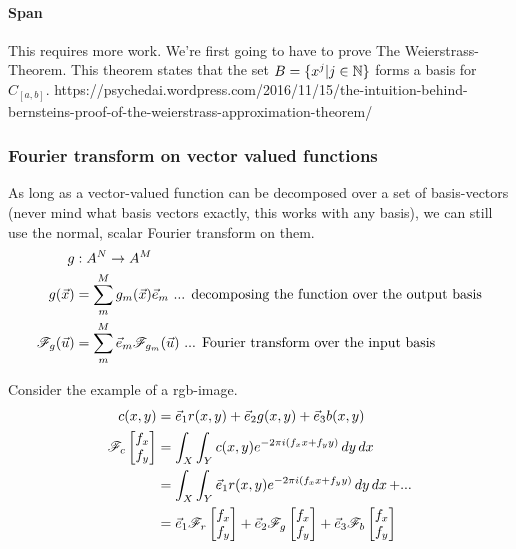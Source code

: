 \paragraph{Span} This  requires more work.  We're first going to have to prove The Weierstrass-Theorem. This theorem states that the set $B = \{ x^j | j \in \mathbb{N} \}$ forms a basis for $C_{[a,b]}$.
https://psychedai.wordpress.com/2016/11/15/the-intuition-behind-bernsteins-proof-of-the-weierstrass-approximation-theorem/


\subsubsection{Fourier transform on vector valued functions}
As long as a vector-valued function can be decomposed over a set of basis-vectors (never mind what basis vectors exactly, this works with any basis), we can still use the normal, scalar Fourier transform on them. 
\begin{equation}
    \begin{split}
        g &: A^N \to A^M \\
        g(\vec{x}) &= \sum_m^M g_m(\vec{x}) \vec{e}_m \text{ ... decomposing the function over the output basis} \\
        \mathscr{F}_g(\vec{u}) &= \sum_m^M \vec{e}_m \mathscr{F}_{g_m}(\vec{u})  \text{ ... Fourier transform over the input basis}
    \end{split}
\end{equation}

Consider the example of a rgb-image.
\begin{equation}
    \begin{split}
        c(x,y) &= \vec{e}_1 r(x,y) + \vec{e}_2 g(x,y) + \vec{e}_3 b(x,y) \\
        \mathscr{F}_c\begin{bmatrix} f_x \\ f_y \end{bmatrix} 
                        &= \int_X \int_Y c(x,y) e^{-2\pi i (f_xx + f_yy)} \mathop{dy} \mathop{dx} \\
                        &= \int_X \int_Y \vec{e}_1 r(x,y) e^{-2\pi i (f_xx + f_yy)} \mathop{dy} \mathop{dx} + ... \\
                        &= \vec{e}_1 \mathscr{F}_r\begin{bmatrix} f_x \\ f_y \end{bmatrix} + \vec{e}_2 \mathscr{F}_g\begin{bmatrix} f_x \\ f_y \end{bmatrix} + \vec{e}_3 \mathscr{F}_b\begin{bmatrix} f_x \\ f_y \end{bmatrix} 
    \end{split}
\end{equation}

